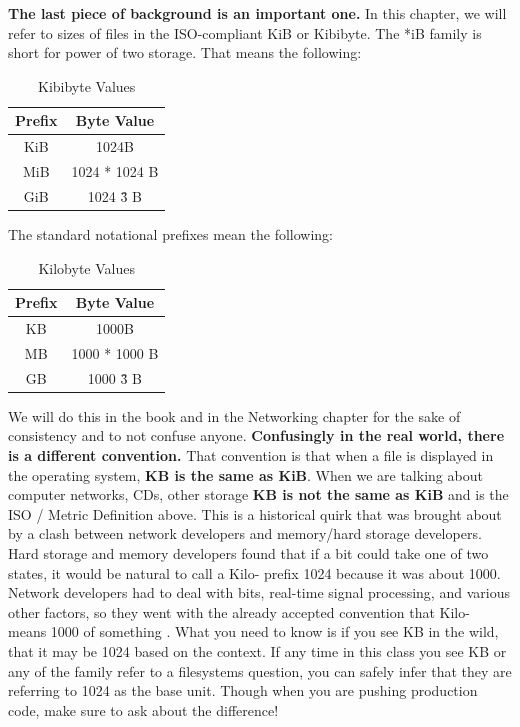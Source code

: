 \textbf{The last piece of background is an important one.} In this chapter, we will refer to sizes of files in the ISO-compliant KiB or Kibibyte.
The *iB family is short for power of two storage.
That means the following:

\begin{center}
\begin{table}[h]
\caption{Kibibyte Values}
\begin{tabular}{ | c | c | }
Prefix & Byte Value \\ \hline
KiB & 1024B \\
MiB & 1024 * 1024 B \\
GiB & 1024 \^ 3 B
\end{tabular}
\end{table}
\end{center}

The standard notational prefixes mean the following:

\begin{center}
\begin{table}[h]
\caption{Kilobyte Values}
\begin{tabular}{ | c | c | }
Prefix & Byte Value \\ \hline
KB & 1000B \\
MB & 1000 * 1000 B \\
GB & 1000 \^ 3 B
\end{tabular}
\end{table}
\end{center}

We will do this in the book and in the Networking chapter for the sake of consistency and to not confuse anyone.
\textbf{Confusingly in the real world, there is a different convention.}
That convention is that when a file is displayed in the operating system, \textbf{KB is the same as KiB}.
When we are talking about computer networks, CDs, other storage \textbf{KB is not the same as KiB} and is the ISO / Metric Definition above.
This is a historical quirk that was brought about by a clash between network developers and memory/hard storage developers.
Hard storage and memory developers found that if a bit could take one of two states, it would be natural to call a Kilo- prefix 1024 because it was about 1000.
Network developers had to deal with bits, real-time signal processing, and various other factors, so they went with the already accepted convention that Kilo- means 1000 of something \cite{iec}.
What you need to know is if you see KB in the wild, that it may be 1024 based on the context.
If any time in this class you see KB or any of the family refer to a filesystems question, you can safely infer that they are referring to 1024 as the base unit.
Though when you are pushing production code, make sure to ask about the difference!

